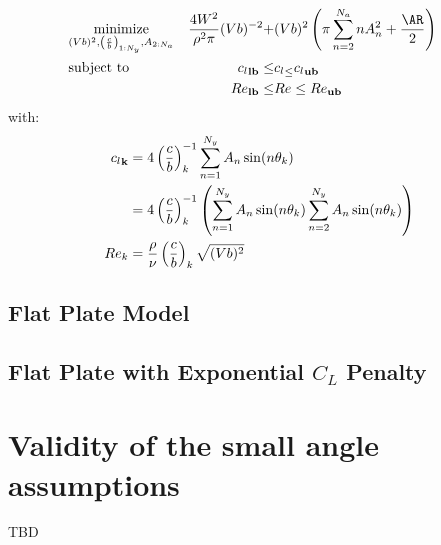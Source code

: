 \documentclass[letterpaper,12pt]{article}
\begin{document}
\begin{align*}
	& \underset{(Vb)^2, \cb{1:N_y}, A_{2:N_a}}{\text{minimize}}  &
	\frac{4W^2}{\rho^2 \pi} (Vb)^{-2} + &
	(Vb)^2\left( 
	\pi \sum_{n=2}^{N_a} n A_n^2 +  
	\frac {\AR} {2} \right) & \\
	& \text{subject to} & \cl{lb} \leq &\cl \leq \cl{ub} \\
	& & {Re}_{\bf lb} \leq &{Re} \leq {Re}_{\bf ub}
\end{align*}
with:
\begin{align*}
	 {c_l}_{\bf k} &= 4 \left( \frac c b \right)_{k}^{-1} \sum_{n=1}^{N_y} A_n \sin(n \theta_k)   \\
	 &= 4 \left( \frac c b \right)_{k}^{-1}\left(\sum_{n=1}^{N_y} A_n \sin(n \theta_k) \sum_{n=2}^{N_y} A_n \sin(n \theta_k) \right)\\
	 Re_{k} &= \frac{\rho}{\nu}\left( \frac c b \right)_{k}\sqrt{(Vb)^2} 
\end{align*}


\subsection{Flat Plate Model}
\subsection{Flat Plate with Exponential $C_L$ Penalty}

\appendix

\section{Validity of the small angle assumptions}
\label{apx:smallangle}
TBD
\end{document}
